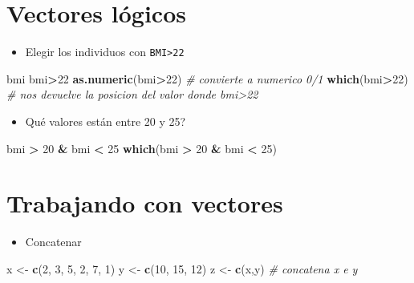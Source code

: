 \documentclass[]{book}
\newenvironment{Shaded}{\begin{snugshade}}{\end{snugshade}}
\newcommand{\KeywordTok}[1]{\textcolor[rgb]{0.13,0.29,0.53}{\textbf{#1}}}
\newcommand{\DecValTok}[1]{\textcolor[rgb]{0.00,0.00,0.81}{#1}}
\newcommand{\StringTok}[1]{\textcolor[rgb]{0.31,0.60,0.02}{#1}}
\newcommand{\CommentTok}[1]{\textcolor[rgb]{0.56,0.35,0.01}{\textit{#1}}}
\newcommand{\OperatorTok}[1]{\textcolor[rgb]{0.81,0.36,0.00}{\textbf{#1}}}
\newcommand{\NormalTok}[1]{#1}
\providecommand{\tightlist}{%
  \setlength{\itemsep}{0pt}\setlength{\parskip}{0pt}}
\begin{document}
\section{Vectores lógicos}\label{vectores-logicos}

\begin{itemize}
\tightlist
\item
  Elegir los individuos con \texttt{BMI\textgreater{}22}
\end{itemize}

\begin{Shaded}
\begin{Highlighting}[]
\NormalTok{bmi}
\NormalTok{bmi}\OperatorTok{>}\DecValTok{22}
\KeywordTok{as.numeric}\NormalTok{(bmi}\OperatorTok{>}\DecValTok{22}\NormalTok{) }\CommentTok{# convierte a numerico 0/1}
\KeywordTok{which}\NormalTok{(bmi}\OperatorTok{>}\DecValTok{22}\NormalTok{)  }\CommentTok{# nos devuelve la posicion del valor donde bmi>22}
\end{Highlighting}
\end{Shaded}

\begin{itemize}
\tightlist
\item
  Qué valores están entre 20 y 25?
\end{itemize}

\begin{Shaded}
\begin{Highlighting}[]
\NormalTok{bmi }\OperatorTok{>}\StringTok{ }\DecValTok{20} \OperatorTok{&}\StringTok{ }\NormalTok{bmi }\OperatorTok{<}\StringTok{ }\DecValTok{25}
\KeywordTok{which}\NormalTok{(bmi }\OperatorTok{>}\StringTok{ }\DecValTok{20} \OperatorTok{&}\StringTok{ }\NormalTok{bmi }\OperatorTok{<}\StringTok{ }\DecValTok{25}\NormalTok{)}
\end{Highlighting}
\end{Shaded}

\section{Trabajando con vectores}\label{trabajando-con-vectores}

\begin{itemize}
\tightlist
\item
  Concatenar
\end{itemize}

\begin{Shaded}
\begin{Highlighting}[]
\NormalTok{x <-}\StringTok{ }\KeywordTok{c}\NormalTok{(}\DecValTok{2}\NormalTok{, }\DecValTok{3}\NormalTok{, }\DecValTok{5}\NormalTok{, }\DecValTok{2}\NormalTok{, }\DecValTok{7}\NormalTok{, }\DecValTok{1}\NormalTok{)}
\NormalTok{y <-}\StringTok{ }\KeywordTok{c}\NormalTok{(}\DecValTok{10}\NormalTok{, }\DecValTok{15}\NormalTok{, }\DecValTok{12}\NormalTok{)}
\NormalTok{z <-}\StringTok{ }\KeywordTok{c}\NormalTok{(x,y)  }\CommentTok{# concatena x e y}
\end{Highlighting}
\end{Shaded}
\end{document}
